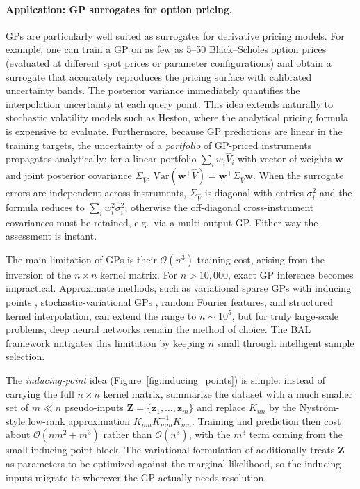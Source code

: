\documentclass[11pt,a4paper]{report}
\begin{document}
\paragraph{Application: GP surrogates for option pricing.}
GPs are particularly well suited as surrogates for derivative pricing models.  For example, one can train a GP on as few as 5--50 Black--Scholes option prices (evaluated at different spot prices or parameter configurations) and obtain a surrogate that accurately reproduces the pricing surface with calibrated uncertainty bands.  The posterior variance immediately quantifies the interpolation uncertainty at each query point.  This idea extends naturally to stochastic volatility models such as Heston, where the analytical pricing formula is expensive to evaluate.  Furthermore, because GP predictions are linear in the training targets, the uncertainty of a \emph{portfolio} of GP-priced instruments propagates analytically: for a linear portfolio $\sum_i w_i \hat{V}_i$ with vector of weights $\bm{w}$ and joint posterior covariance $\Sigma_{\hat{V}}$, $\mathrm{Var}(\bm{w}^\top \hat{V}) = \bm{w}^\top \Sigma_{\hat{V}} \bm{w}$.  When the surrogate errors are independent across instruments, $\Sigma_{\hat{V}}$ is diagonal with entries $\sigma_i^2$ and the formula reduces to $\sum_i w_i^2 \sigma_i^2$; otherwise the off-diagonal cross-instrument covariances must be retained, e.g.\ via a multi-output GP.  Either way the assessment is instant.

\begin{remarkbox}
The main limitation of GPs is their $\mathcal{O}(n^3)$ training cost, arising from the inversion of the $n \times n$ kernel matrix.  For $n > 10{,}000$, exact GP inference becomes impractical.  Approximate methods, such as variational sparse GPs with inducing points \citep{titsias2009variational}, stochastic-variational GPs \citep{hensman2013gaussian}, random Fourier features, and structured kernel interpolation, can extend the range to $n \sim 10^5$, but for truly large-scale problems, deep neural networks remain the method of choice.  The BAL framework mitigates this limitation by keeping $n$ small through intelligent sample selection.

\medskip
The \emph{inducing-point} idea (Figure~\ref{fig:inducing_points}) is simple: instead of carrying the full $n\times n$ kernel matrix, summarize the dataset with a much smaller set of $m \ll n$ pseudo-inputs $\bm Z = \{\bm z_1,\dots,\bm z_m\}$ and replace $K_{nn}$ by the Nystr\"om-style low-rank approximation $K_{nm}K_{mm}^{-1}K_{mn}$.  Training and prediction then cost about $\mathcal{O}(nm^2 + m^3)$ rather than $\mathcal{O}(n^3)$, with the $m^3$ term coming from the small inducing-point block.  The variational formulation of \citet{titsias2009variational} additionally treats $\bm Z$ as parameters to be optimized against the marginal likelihood, so the inducing inputs migrate to wherever the GP actually needs resolution.
\end{remarkbox}
\end{document}

